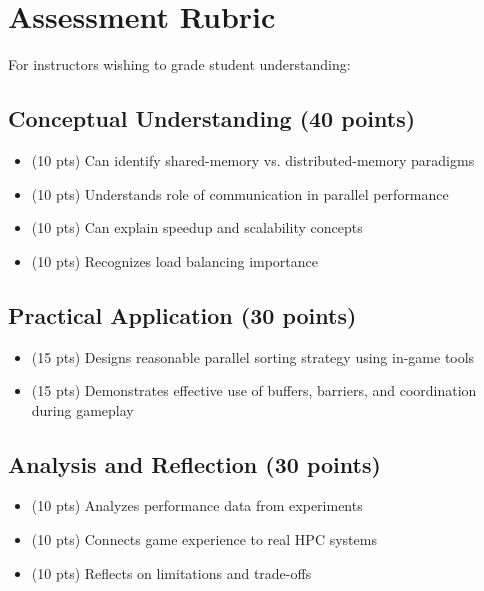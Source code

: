 
\section{Assessment Rubric}
\label{app:d:assessment-rubric}

For instructors wishing to grade student understanding:

\subsection{Conceptual Understanding (40 points)}

\begin{itemize}
    \item (10 pts) Can identify shared-memory vs. distributed-memory paradigms
    \item (10 pts) Understands role of communication in parallel performance
    \item (10 pts) Can explain speedup and scalability concepts
    \item (10 pts) Recognizes load balancing importance
\end{itemize}

\subsection{Practical Application (30 points)}

\begin{itemize}
    \item (15 pts) Designs reasonable parallel sorting strategy using in-game tools
    \item (15 pts) Demonstrates effective use of buffers, barriers, and coordination during gameplay
\end{itemize}

\subsection{Analysis and Reflection (30 points)}

\begin{itemize}
    \item (10 pts) Analyzes performance data from experiments
    \item (10 pts) Connects game experience to real HPC systems
    \item (10 pts) Reflects on limitations and trade-offs
\end{itemize}

